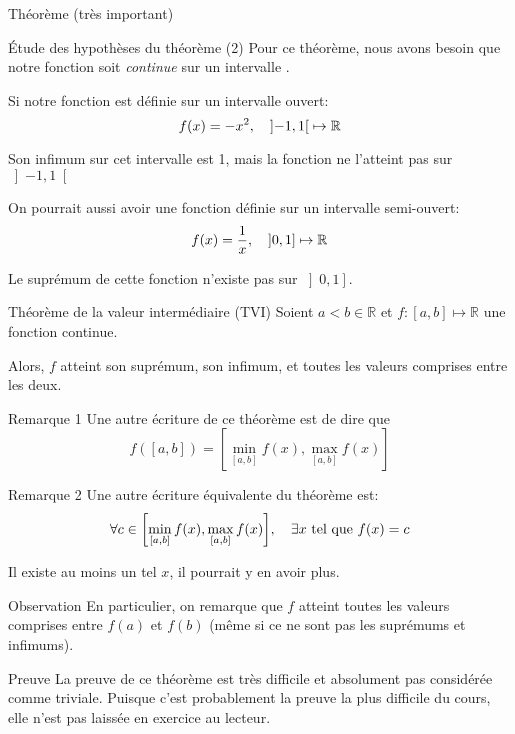\documentclass[a4paper]{article}
\begin{document}
\begin{parag}{Théorème (très important)}
    \begin{subparag}{Étude des hypothèses du théorème (2)}
        Pour ce théorème, nous avons besoin que notre fonction soit \textit{continue} sur un intervalle .

        Si notre fonction est définie sur un intervalle ouvert: 
        \[f\left(x\right) =  - x^2, \mathspace \left]-1, 1\right[  \mapsto \mathbb{R}\]

        Son infimum sur cet intervalle est 1, mais la fonction ne l'atteint pas sur $\left]-1, 1\right[ $
        

        On pourrait aussi avoir une fonction définie sur un intervalle semi-ouvert: 
        \[f\left(x\right) = \frac{1}{x}, \mathspace \left]0,1\right]  \mapsto \mathbb{R}\]
        
        Le suprémum de cette fonction n'existe pas sur $\left]0, 1\right] $.
    \end{subparag}
\end{parag}

\begin{parag}{Théorème de la valeur intermédiaire (TVI)}
    Soient $a < b \in \mathbb{R}$ et $f : \left[a,b\right]  \mapsto \mathbb{R}$ une fonction continue.

    Alors, $f$ atteint son suprémum, son infimum, et toutes les valeurs comprises entre les deux.

    \begin{subparag}{Remarque 1}
        Une autre écriture de ce théorème est de dire que 
        \[f\left(\left[a, b\right]\right) = \left[\min_{\left[a,b\right]} f\left(x\right), \max_{\left[a,b\right]} f\left(x\right)\right]\]
    \end{subparag}

    \begin{subparag}{Remarque 2}
        Une autre écriture équivalente du théorème est: 
        \[\forall c \in \left[\min_{\left[a,b\right]} f\left(x\right), \max_{\left[a,b\right]} f\left(x\right)\right], \mathspace \exists x \telque f\left(x\right) = c\]

        Il existe au moins un tel $x$, il pourrait y en avoir plus.
    \end{subparag}
    
    \begin{subparag}{Observation}
        En particulier, on remarque que $f$ atteint toutes les valeurs comprises entre $f\left(a\right)$ et $f\left(b\right)$ (même si ce ne sont pas les suprémums et infimums).
    \end{subparag}

    \begin{subparag}{Preuve}
        La preuve de ce théorème est très difficile et absolument pas considérée comme triviale. Puisque c'est probablement la preuve la plus difficile du cours, elle n'est pas laissée en exercice au lecteur.
    \end{subparag}

\end{parag}
\end{document}
